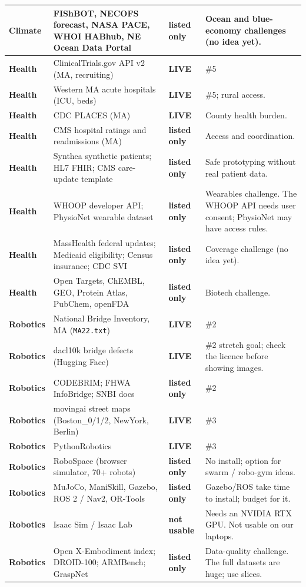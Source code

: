 \documentclass[11pt]{article}
\newcommand{\LIVE}{\textcolor{okgreen}{\textbf{LIVE}}}
\newcommand{\LISTED}{\textcolor{greyish}{\textbf{listed only}}}
\newcommand{\tagR}{\textcolor{robo}{\textbf{Robotics}}}
\newcommand{\tagE}{\textcolor{clim}{\textbf{Climate}}}
\newcommand{\tagH}{\textcolor{health}{\textbf{Health}}}
\begin{document}
\begin{longtable}{@{}L{1.5cm} L{5.0cm} L{2.0cm} L{6.6cm}@{}}
\tagE & FIShBOT, NECOFS forecast, NASA PACE, WHOI HABhub, NE Ocean Data Portal & \LISTED & Ocean and blue-economy challenges (no idea yet).\\
\midrule
\tagH & ClinicalTrials.gov API v2 (MA, recruiting) & \LIVE & \#5\\
\tagH & Western MA acute hospitals (ICU, beds) & \LIVE & \#5; rural access.\\
\tagH & CDC PLACES (MA) & \LIVE & County health burden.\\
\tagH & CMS hospital ratings and readmissions (MA) & \LISTED & Access and coordination.\\
\tagH & Synthea synthetic patients; HL7 FHIR; CMS care-update template & \LISTED & Safe prototyping without real patient data.\\
\tagH & WHOOP developer API; PhysioNet wearable dataset & \LISTED & Wearables challenge. The WHOOP API needs user consent; PhysioNet may have access rules.\\
\tagH & MassHealth federal updates; Medicaid eligibility; Census insurance; CDC SVI & \LISTED & Coverage challenge (no idea yet).\\
\tagH & Open Targets, ChEMBL, GEO, Protein Atlas, PubChem, openFDA & \LISTED & Biotech challenge.\\
\midrule
\tagR & National Bridge Inventory, MA (\texttt{MA22.txt}) & \LIVE & \#2\\
\tagR & dacl10k bridge defects (Hugging Face) & \LIVE & \#2 stretch goal; check the licence before showing images.\\
\tagR & CODEBRIM; FHWA InfoBridge; SNBI docs & \LISTED & \#2\\
\tagR & movingai street maps (Boston\_0/1/2, NewYork, Berlin) & \LIVE & \#3\\
\tagR & PythonRobotics & \LIVE & \#3\\
\tagR & RoboSpace (browser simulator, 70+ robots) & \LISTED & No install; option for swarm / robo-gym ideas.\\
\tagR & MuJoCo, ManiSkill, Gazebo, ROS 2 / Nav2, OR-Tools & \LISTED & Gazebo/ROS take time to install; budget for it.\\
\tagR & Isaac Sim / Isaac Lab & \textcolor{badred}{\textbf{not usable}} & Needs an NVIDIA RTX GPU. Not usable on our laptops.\\
\tagR & Open X-Embodiment index; DROID-100; ARMBench; GraspNet & \LISTED & Data-quality challenge. The full datasets are huge; use slices.\\
\bottomrule
\end{longtable}
\end{document}
